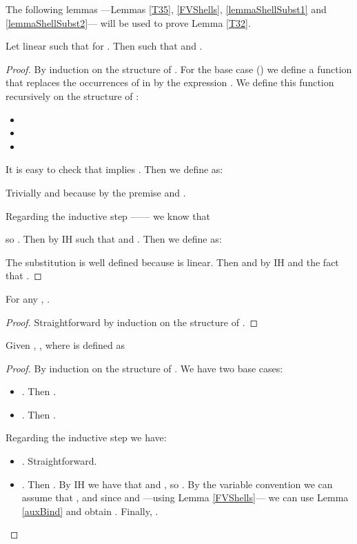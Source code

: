 The following lemmas ---Lemmas \ref{T35}, \ref{FVShells}, \ref{lemmaShellSubst1} and \ref{lemmaShellSubst2}--- will be used to prove Lemma \ref{T32}.

\begin{lemma}\label{T35}
Let linear  such that  for . Then  such that  and .
\end{lemma}
\begin{proof}
By induction on the structure of . For the base case () we define a function   that replaces the occurrences of  in  by the expression . We define this function recursively on the structure of :
\begin{itemize}
  \item 
  \item 
  \item 
\end{itemize}
  It is easy to check that  implies . Then we define  as:
  
  Trivially  and  because  by the premise and .

Regarding the inductive step ------ we know that 

so . Then by IH  such that  and . Then we define  as:
  
  The substitution  is well defined because  is linear. Then  and  by IH and the fact that .
\end{proof}






\begin{lemma}\label{FVShells}
For any , .
\end{lemma}
\begin{proof}
Straightforward by induction on the structure of .
\end{proof}

\begin{lemma}\label{lemmaShellSubst1}
Given , ,  where  is defined as 
\end{lemma}
\begin{proof}
By induction on the structure of . We have two base cases:
\begin{itemize}
  \item . Then .
  \item . Then .
\end{itemize}

Regarding the inductive step we have:
\begin{itemize}
  \item . Straightforward.
  \item . Then . By IH we have that  and , so . By the variable convention we can assume that , and since  and  ---using Lemma \ref{FVShells}--- we can use Lemma \ref{auxBind} and obtain . Finally, .
\end{itemize}
\end{proof}

